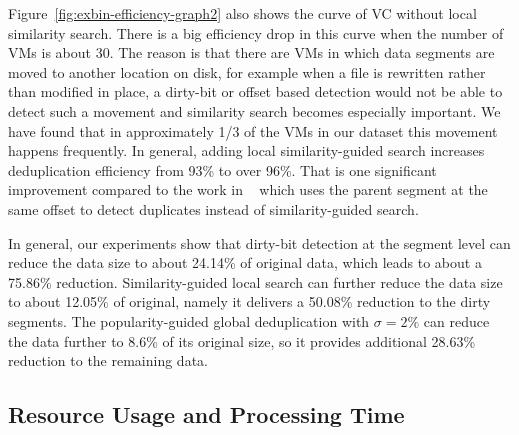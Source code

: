 Figure~\ref{fig:exbin-efficiency-graph2} also shows the curve  of VC without local similarity search.
There is a big efficiency drop in this curve when the number of VMs is about 30.
The reason is that  
there are VMs in which
data  segments are moved to another location on disk, for example when a file is rewritten
rather than modified in place,  
a dirty-bit or offset based detection would not be able to detect such a movement and 
similarity search becomes especially important.  We have found that in
approximately 1/3 of the VMs in our dataset this movement happens frequently.
In general, adding local similarity-guided search increases deduplication efficiency from 93\% to over 96\%.
That is one significant improvement compared to the work in ~\cite{WeiZhangIEEE}
which uses the parent segment at the same offset to detect duplicates instead of similarity-guided search.

In general, our experiments show that
dirty-bit detection at the segment level can reduce the data size to about 24.14\% of original data, 
which leads to about a 75.86\% reduction.
Similarity-guided local search can further reduce the data size
to about 12.05\% of original, namely it delivers a 50.08\% reduction to the dirty segments.
The popularity-guided global deduplication with $\sigma=2\% $
can reduce the data further to 8.6\% of its original size, so
it provides additional 28.63\% reduction to the remaining data.


\subsection{Resource Usage and Processing Time}

